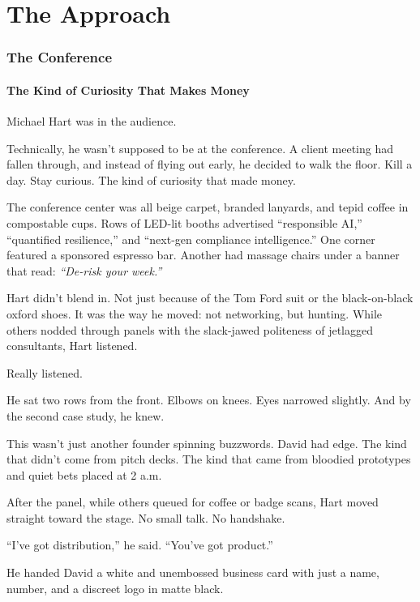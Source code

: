 \part{The Approach}

\section{The Conference}

\subsection{The Kind of Curiosity That Makes Money}

Michael Hart was in the audience.

Technically, he wasn’t supposed to be at the conference. A client meeting had fallen through, and instead 
of flying out early, he decided to walk the floor. Kill a day. Stay curious. The kind of curiosity 
that made money.

The conference center was all beige carpet, branded lanyards, and tepid coffee in compostable cups. Rows of 
LED-lit booths advertised ``responsible AI,'' ``quantified resilience,'' and ``next-gen compliance intelligence.''
One corner featured a sponsored espresso bar. Another had massage chairs under a banner that read: 
\textit{``De-risk your week.''}

Hart didn’t blend in. Not just because of the Tom Ford suit or the black-on-black oxford shoes. It was the 
way he moved: not networking, but hunting. While others nodded through panels with the slack-jawed politeness 
of jetlagged consultants, Hart listened.

Really listened.

He sat two rows from the front. Elbows on knees. Eyes narrowed slightly. And by the second case study, he knew.

This wasn’t just another founder spinning buzzwords. David had edge. The kind that didn’t come from pitch decks. 
The kind that came from bloodied prototypes and quiet bets placed at 2 a.m.

After the panel, while others queued for coffee or badge scans, Hart moved straight toward the stage. No small talk. 
No handshake.

``I’ve got distribution,'' he said. ``You’ve got product.''

He handed David a white and unembossed business card with just a name, number, and a discreet logo in matte black.

